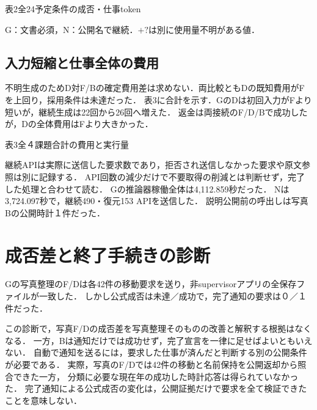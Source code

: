 \documentclass[uplatex,a4paper,twocolumn,10pt]{jsarticle}
\begin{document}
\begin{center}\begin{minipage}{\columnwidth}\centering
\small 表2\quad 全24予定条件の成否・仕事token\par\smallskip
\PublicDisplayAllCells
\par\smallskip\footnotesize G：文書必須，N：公開名で継続．$+?$は別に使用量不明がある値．
\end{minipage}\end{center}

\subsection{入力短縮と仕事全体の費用}
不明生成のためD対F/Bの確定費用差は求めない．両比較ともDの既知費用がFを上回り，採用条件は未達だった．
表3に合計を示す．GのDは初回入力がFより短いが，継続生成は22回から26回へ増えた．
返金は両接続のF/D/Bで成功したが，Dの全体費用はFより大きかった．

\begin{center}\begin{minipage}{\columnwidth}\centering
\small 表3\quad 全４課題合計の費用と実行量\par\smallskip
\PublicDisplayTotals
\end{minipage}\end{center}

継続APIは実際に送信した要求数であり，拒否され送信しなかった要求や原文参照は別に記録する．
API回数の減少だけで不要取得の削減とは判断せず，完了した処理と合わせて読む．
Gの推論器稼働全体は4,112.859秒だった．
Nは3,724.097秒で，継続490・復元153 APIを送信した．
説明公開前の呼出しは写真Bの公開時計１件だった．

\section{成否差と終了手続きの診断}
Gの写真整理のF/Dは各42件の移動要求を送り，非supervisorアプリの全保存ファイルが一致した．
しかし公式成否は未達／成功で，完了通知の要求は０／１件だった．

この診断で，写真F/Dの成否差を写真整理そのものの改善と解釈する根拠はなくなる．
一方，Bは通知だけでは成功せず，完了宣言を一律に足せばよいともいえない．
自動で通知を送るには，要求した仕事が済んだと判断する別の公開条件が必要である．
実際，写真のF/Dでは42件の移動と名前保持を公開返却から照合できた一方，
分類に必要な現在年の成功した時計応答は得られていなかった．
完了通知による公式成否の変化は，公開証拠だけで要求を全て検証できたことを意味しない．
\end{document}
